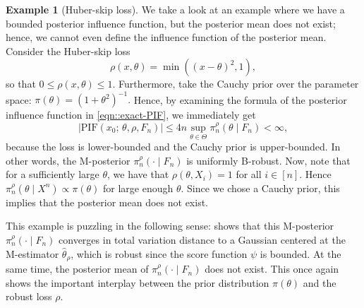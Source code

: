 \documentclass[11pt, oneside]{amsart}
\theoremstyle{definition}   %
\newtheorem{example}{Example}
\newcommand{\loss}{\rho}
\newcommand{\mposterior}{\pi_n^{\loss}}
\begin{document}
\begin{example}[Huber-skip loss] \label{example::Huber-skip-loss}
    We take a look at an example where we have a bounded posterior influence function, but the posterior mean does not exist; hence, we cannot even define the influence function of the posterior mean.  Consider the Huber-skip loss
    \[ \loss(x,\theta) = \min ((x-\theta)^2, 1), \] 
    so that \( 0 \leq \rho(x,\theta) \leq 1. \) Furthermore, take the Cauchy prior over the parameter space: 
    \( \pi(\theta) = (1 + \theta^2)^{-1}. \)
    Hence, by examining the formula of the posterior influence function in \eqref{eqn::exact-PIF}, we immediately get
    \begin{equation*}
        \bigl|\mathrm{PIF}(x_0;\,\theta,\rho,F_n)\bigr| \leq 4n\sup_{\theta\in\Theta}\pi_n^\rho(\theta\mid F_n)<\infty,
    \end{equation*}
    because the loss is lower-bounded and the Cauchy prior is upper-bounded. In other words,  the M-posterior \( \mposterior (\cdot \mid F_n)\) is uniformly B-robust. Now, note that for a sufficiently large \( \theta \), we have that \( \loss(\theta, X_i) = 1 \) for all \( i \in [n]\). Hence \( \mposterior(\theta \mid X^n) \propto \pi(\theta)\) for large enough \( \theta\). Since we chose a Cauchy prior, this implies that the posterior mean does not exist. 
    
    This example is puzzling in the following sense:  shows that this M-posterior \( \mposterior(\cdot \mid F_n)\) converges in total variation distance to a Gaussian centered at the M-estimator \(\hat{\theta}_{\loss}\), which is robust since the score function \(\psi\) is bounded. At the same time, the posterior mean of \( \mposterior(\cdot \mid F_n)\) does not exist. This once again shows the important interplay between the prior distribution \(\pi(\theta)\) and the robust loss \( \loss \).

\end{example}

% 
% 

\end{document}
